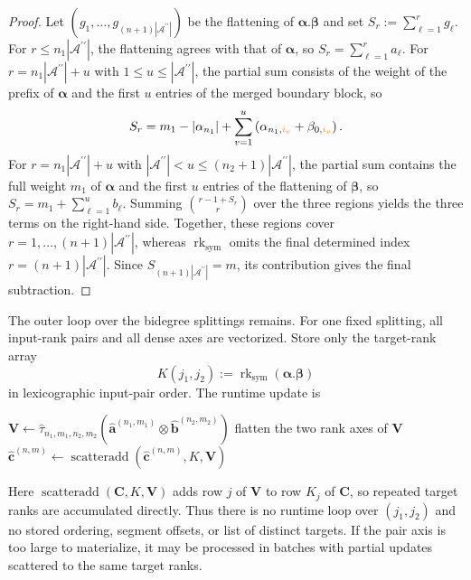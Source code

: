 \documentclass{amsart}
\theoremstyle{definition}
\theoremstyle{remark}
\newcommand{\dott}{.}
\newcommand{\orange}[1]{{\color{orange}#1}}
\begin{document}
\begin{proof}
Let
$(g_1,\ldots,g_{(n+1)|\mathcal{A}^{\prime\prime}|})$
be the flattening of
$\boldsymbol{\alpha}\dott\boldsymbol{\beta}$ and set
$S_r:=\sum_{\ell=1}^{r}g_\ell$.
For $r\leq n_1|\mathcal{A}^{\prime\prime}|$, the flattening agrees with
that of $\boldsymbol{\alpha}$, so
$S_r=\sum_{\ell=1}^{r}a_\ell$.
For
$r=n_1|\mathcal{A}^{\prime\prime}|+u$ with
$1\leq u\leq|\mathcal{A}^{\prime\prime}|$, the partial sum consists of
the weight of the prefix of $\boldsymbol{\alpha}$ and the first $u$
entries of the merged boundary block, so
\[
    S_r
    =
    m_1-|\alpha_{n_1}|
    +
    \sum_{v=1}^{u}
    \left(
        \alpha_{n_1,\orange{i_v}}
        +
        \beta_{0,\orange{i_v}}
    \right).
\]
For
$r=n_1|\mathcal{A}^{\prime\prime}|+u$ with
$|\mathcal{A}^{\prime\prime}|<u
\leq(n_2+1)|\mathcal{A}^{\prime\prime}|$, the partial sum contains the
full weight $m_1$ of $\boldsymbol{\alpha}$ and the first $u$ entries of
the flattening of $\boldsymbol{\beta}$, so
$S_r=m_1+\sum_{\ell=1}^{u}b_\ell$.
Summing $\binom{r-1+S_r}{r}$ over the three regions yields the three
terms on the right-hand side. Together, these regions cover
$r=1,\ldots,(n+1)|\mathcal{A}^{\prime\prime}|$, whereas
$\operatorname{rk}_{\mathrm{sym}}$ omits the final determined index
$r=(n+1)|\mathcal{A}^{\prime\prime}|$. Since
$S_{(n+1)|\mathcal{A}^{\prime\prime}|}=m$, its contribution gives the final subtraction.
\end{proof}
\begin{implrmk}
The outer loop over the bidegree splittings remains. For one fixed
splitting, all input-rank pairs and all dense axes are vectorized. Store only
the target-rank array
\[
    K(j_1,j_2)
    :=
    \operatorname{rk}_{\mathrm{sym}}
    \left(
        \boldsymbol{\alpha}\dott\boldsymbol{\beta}
    \right)
\]
in lexicographic input-pair order. The runtime update is
\begin{algorithmic}[1]
\State $\mathbf{V}\gets
    \widehat{\tau}_{n_1,m_1,n_2,m_2}
    \left(
        \widehat{\mathbf{a}}^{(n_1,m_1)}
        \otimes
        \widehat{\mathbf{b}}^{(n_2,m_2)}
    \right)$
\State flatten the two rank axes of $\mathbf{V}$
\State $\widehat{\mathbf{c}}^{(n,m)}\gets
    \operatorname{scatteradd}
    \left(
        \widehat{\mathbf{c}}^{(n,m)},K,\mathbf{V}
    \right)$
\end{algorithmic}
Here $\operatorname{scatteradd}(\mathbf{C},K,\mathbf{V})$ adds row $j$ of
$\mathbf{V}$ to row $K_j$ of $\mathbf{C}$, so repeated target ranks are
accumulated directly. Thus there is no runtime loop over $(j_1,j_2)$ and no
stored ordering, segment offsets, or list of distinct targets. If the pair
axis is too large to materialize, it may be processed in batches with partial
updates scattered to the same target ranks.
\end{implrmk}
\end{document}
